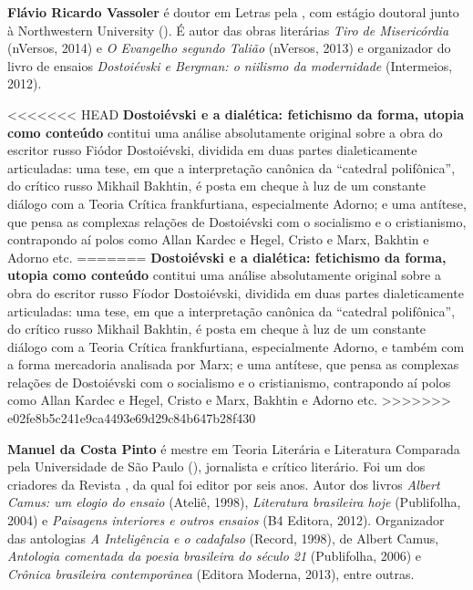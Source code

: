 
\textbf{Flávio Ricardo Vassoler} é doutor em Letras pela , com estágio doutoral junto à
  Northwestern University (). É autor das obras literárias \emph{Tiro
  de Misericórdia} (nVersos, 2014) e \emph{O Evangelho segundo Talião}
  (nVersos, 2013) e organizador do livro de ensaios \emph{Dostoiévski e
  Bergman: o niilismo da modernidade} (Intermeios, 2012).

<<<<<<< HEAD
\textbf{Dostoiévski e a dialética: fetichismo da forma, utopia como conteúdo} contitui uma análise absolutamente original sobre a obra do escritor russo Fiódor Dostoiévski, dividida em duas partes dialeticamente articuladas: uma tese, em que a interpretação canônica da ``catedral polifônica'', do crítico russo Mikhail Bakhtin, é posta em cheque à luz de um constante diálogo com a Teoria Crítica frankfurtiana, especialmente Adorno; e uma antítese, que pensa as complexas relações de Dostoiévski com o socialismo e o cristianismo, contrapondo aí polos como Allan Kardec e Hegel, Cristo e Marx, Bakhtin e Adorno etc.
=======
\textbf{Dostoiévski e a dialética: fetichismo da forma, utopia como conteúdo} contitui uma análise absolutamente original sobre a obra do escritor russo Fíodor Dostoiévski, dividida em duas partes dialeticamente articuladas: uma tese, em que a interpretação canônica da ``catedral polifônica'', do crítico russo Mikhail Bakhtin, é posta em cheque à luz de um constante diálogo com a Teoria Crítica frankfurtiana, especialmente Adorno, e também com a forma mercadoria analisada por Marx; e uma antítese, que pensa as complexas relações de Dostoiévski com o socialismo e o cristianismo, contrapondo aí polos como Allan Kardec e Hegel, Cristo e Marx, Bakhtin e Adorno etc.
>>>>>>> e02fe8b5c241e9ca4493e69d29c84b647b28f430

\textbf{Manuel da Costa Pinto} é mestre em Teoria Literária e Literatura Comparada pela Universidade de São Paulo (), jornalista e crítico literário. Foi um dos criadores da Revista , da qual foi editor por seis anos. Autor dos livros \emph{Albert Camus: um elogio do ensaio} (Ateliê, 1998), \emph{Literatura brasileira hoje} (Publifolha, 2004) e \emph{Paisagens interiores e outros ensaios} (B4 Editora, 2012). Organizador das antologias \emph{A Inteligência e o cadafalso} (Record, 1998), de Albert Camus, \emph{Antologia comentada da poesia brasileira do século 21} (Publifolha, 2006) e \emph{Crônica brasileira contemporânea} (Editora Moderna, 2013), entre outras.






